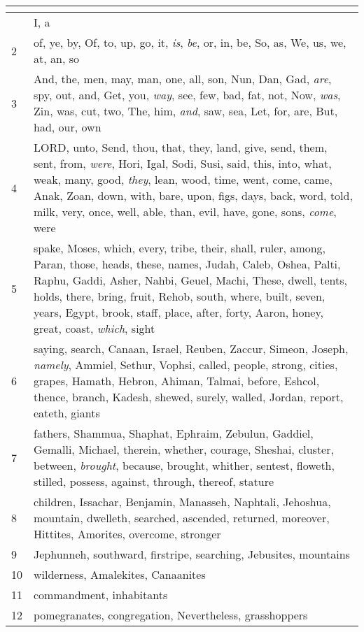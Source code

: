 \begin{center}
\begin{longtable}{l|p{3.75in}}
\hline \multicolumn{2}{c}{{ }} \\ \hline
\endfoot 
1 & I, a\\ \hline 
2 & of, ye, by, Of, to, up, go, it, \emph{is}, \emph{be}, or, in, be, So, as, We, us, we, at, an, so\\ \hline 
3 & And, the, men, may, man, one, all, son, Nun, Dan, Gad, \emph{are}, spy, out, and, Get, you, \emph{way}, see, few, bad, fat, not, Now, \emph{was}, Zin, was, cut, two, The, him, \emph{and}, saw, sea, Let, for, are, But, had, our, own\\ \hline 
4 & LORD, unto, Send, thou, that, they, land, give, send, them, sent, from, \emph{were}, Hori, Igal, Sodi, Susi, said, this, into, what, weak, many, good, \emph{they}, lean, wood, time, went, come, came, Anak, Zoan, down, with, bare, upon, figs, days, back, word, told, milk, very, once, well, able, than, evil, have, gone, sons, \emph{come}, were\\ \hline 
5 & spake, Moses, which, every, tribe, their, shall, ruler, among, Paran, those, heads, these, names, Judah, Caleb, Oshea, Palti, Raphu, Gaddi, Asher, Nahbi, Geuel, Machi, These, dwell, tents, holds, there, bring, fruit, Rehob, south, where, built, seven, years, Egypt, brook, staff, place, after, forty, Aaron, honey, great, coast, \emph{which}, sight\\ \hline 
6 & saying, search, Canaan, Israel, Reuben, Zaccur, Simeon, Joseph, \emph{namely}, Ammiel, Sethur, Vophsi, called, people, strong, cities, grapes, Hamath, Hebron, Ahiman, Talmai, before, Eshcol, thence, branch, Kadesh, shewed, surely, walled, Jordan, report, eateth, giants\\ \hline 
7 & fathers, Shammua, Shaphat, Ephraim, Zebulun, Gaddiel, Gemalli, Michael, therein, whether, courage, Sheshai, cluster, between, \emph{brought}, because, brought, whither, sentest, floweth, stilled, possess, against, through, thereof, stature\\ \hline 
8 & children, Issachar, Benjamin, Manasseh, Naphtali, Jehoshua, mountain, dwelleth, searched, ascended, returned, moreover, Hittites, Amorites, overcome, stronger\\ \hline 
9 & Jephunneh, southward, firstripe, searching, Jebusites, mountains\\ \hline 
10 & wilderness, Amalekites, Canaanites\\ \hline 
11 & commandment, inhabitants\\ \hline 
12 & pomegranates, congregation, Nevertheless, grasshoppers\\ \hline 
\end{longtable}
\end{center}





